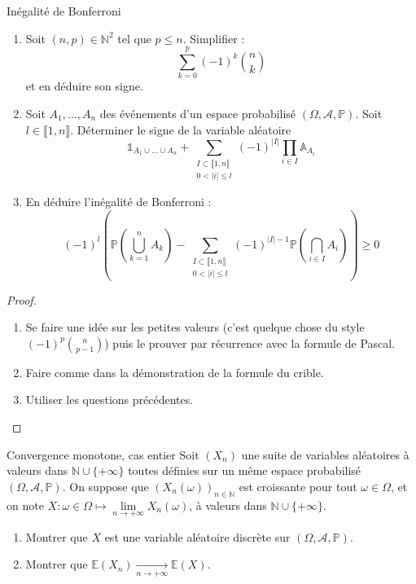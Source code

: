 \documentclass[french,a4paper]{article}
\renewcommand{\P}{\mathbb{P}}
\newcommand{\N}{\mathbb{N}}
\newcommand{\E}{\mathbb{E}}
\theoremstyle{plain}
\theoremstyle{definition}
\theoremstyle{remark}
\begin{document}
\begin{ex}[Moulin.59]{Inégalité de Bonferroni}
	\begin{enumerate}
		\item Soit $(n,p)\in\N^2$ tel que $p\leqslant n$. Simplifier : $$\sum_{k=0}^{p}(-1)^k\binom{n}{k}$$ et en déduire son signe.
		\item Soit $A_1,\ldots,A_n$ des événements d'un espace probabilisé $(\Omega,\mathcal{A},\P)$. Soit $l\in\llbracket1,n\rrbracket$. Déterminer le signe de la variable aléatoire $$\mathbb{1}_{A_1\cup\ldots\cup A_n}+\sum_{\substack{I\subset\llbracket1,n\rrbracket \\ 0<\lvert i\rvert\leqslant l}}(-1)^{\lvert I\rvert}\prod_{i\in I}\mathbb{A}_{A_i}$$
		\item En déduire l'inégalité de Bonferroni : $$(-1)^l\left(\P\left(\bigcup_{k=1}^nA_k\right)-\sum_{\substack{I\subset\llbracket1,n\rrbracket \\ 0<\lvert i\rvert\leqslant l}}(-1)^{\lvert I\rvert-1}\P\left(\bigcap_{i\in I}A_i\right)\right)\geqslant0$$
	\end{enumerate}
\end{ex}
\begin{proof}
	\begin{enumerate}
		\item Se faire une idée sur les petites valeurs (c'est quelque chose du style $(-1)^p\binom{n}{p-1}$) puis le prouver par récurrence avec la formule de Pascal.
		\item Faire comme dans la démonstration de la formule du crible.
		\item Utiliser les questions précédentes.
	\end{enumerate}
\end{proof}

\begin{ex}[Moulin.60]{Convergence monotone, cas entier}
	Soit $(X_n)$ une suite de variables aléatoires à valeurs dans $\N\cup\{+\infty\}$ toutes définies sur un même espace probabilisé $(\Omega,\mathcal{A},\P)$. On suppose que $(X_n(\omega))_{n\in\N}$ est croissante pour tout $\omega\in\Omega$, et on note $X:\omega\in\Omega\mapsto\displaystyle\underset{n\to+\infty}{\lim}X_n(\omega)$, à valeurs dans $\N\cup\{+\infty\}$.
	\begin{enumerate}
		\item Montrer que $X$ est une variable aléatoire discrète sur $(\Omega,\mathcal{A},\P)$.
		\item Montrer que $\E(X_n)\displaystyle\xrightarrow[n\to+\infty]{}\E(X)$.
	\end{enumerate}
\end{ex}
\end{document}
